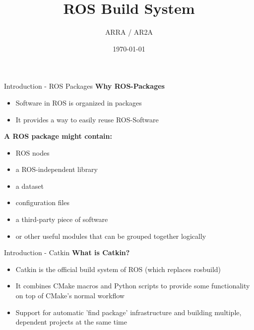 \documentclass{beamer}
\title[]{ROS Build System} %
\author{ARRA / AR2A} %
\institute %
{
\textbf{A}dvancements for \textbf{R}obotics in \textbf{R}escue \textbf{A}pplications
}
\date{\today} %
\begin{document}
\begin{frame}
\titlepage
\end{frame}
\begin{frame}{Introduction - ROS Packages\cite{ROS:2015:Online}}
 \textbf{Why ROS-Packages}
 \begin{itemize}
 \item Software in ROS is organized in packages
 \item It provides a way to easily reuse ROS-Software
 \end{itemize}
  \textbf{A ROS package might contain:}
 \begin{itemize}
 \item ROS nodes
 \item  a ROS-independent library
 \item a dataset
 \item configuration files
 \item a third-party piece of software
 \item or other useful modules that can be grouped together logically
 \end{itemize}
\end{frame}
\begin{frame}{Introduction - Catkin\cite{ROS:2015:Online}}
 \textbf{What is Catkin?}
 \begin{itemize}
 \item Catkin is the official build system of ROS (which replaces rosbuild)
 \item It combines CMake macros and Python scripts to provide some functionality on top of CMake's normal workflow
 \item Support for automatic 'find package' infrastructure and building multiple, dependent projects at the same time
 \end{itemize}

\end{frame}
\end{document}
